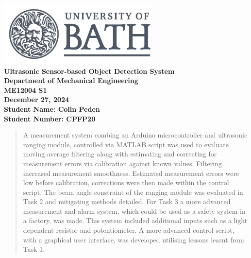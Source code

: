 \documentclass[a4paper,12pt]{article}
\begin{document}
\pagestyle{fancy}  
\fancyhf{}  
\doublespacing  

\setlength{\headheight}{16pt}       
\addtolength{\topmargin}{-4pt}     



\fancyfoot[R]{\thepage}

\begin{titlepage}
  \thispagestyle{empty}
  \centering
  \includegraphics[width=0.6\textwidth]{figs/uob-logo-grey-transparent-1.png} \\[2cm]
  {\Huge\textbf{Ultrasonic Sensor-based Object Detection System}} \\[1.5cm]
  {\LARGE\textbf{Department of Mechanical Engineering}} \\[0.5cm]
  {\LARGE\textbf{ME12004 S1}} \\[2cm]
  {\Large\textbf{December 27, 2024}} \\[2cm]
  {\Large\textbf{Student Name: Colin Peden}} \\[0.5cm]
  {\Large\textbf{Student Number: CPFP20}} \\[1cm]
  \vfill
\end{titlepage}

\tableofcontents

\begin{abstract}
A measurement system combing an Arduino microcontroller and ultrasonic ranging module, controlled via MATLAB script was used to evaluate moving average filtering along with estimating and correcting for measurement errors via calibration against known values. Filtering increased measurement smoothness. Estimated measurement errors were low before calibration, corrections were then made within the control script. The beam angle constraint of the ranging module was evaluated in Task 2 and mitigating methods detailed. For Task 3 a more advanced measurement and alarm system, which could be used as a safety system in a factory, was made. This system included additional inputs such as a light dependent resistor and potentiometer. A more advanced control script, with a graphical user interface, was developed utilising lessons learnt from Task 1.
\end{abstract}
\end{document}
